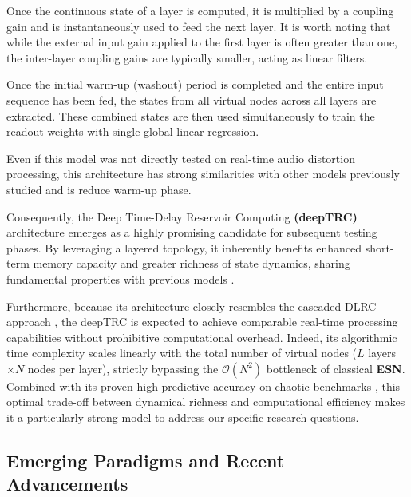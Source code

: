 Once the continuous state of a layer is computed, it is multiplied by a coupling gain and is instantaneously used to feed the next layer. It is worth noting that while the external input gain applied to the first layer is often greater than one, the inter-layer coupling gains are typically smaller, acting as linear filters.

\vspace{0.5cm}

Once the initial warm-up (washout) period is completed and the entire input sequence has been fed, the states from all virtual nodes across all layers are extracted. These combined states are then used simultaneously to train the readout weights with single global linear regression.

\vspace{0.5cm}

Even if this model was not directly tested on real-time audio distortion processing, this architecture has strong similarities with other models previously studied and is reduce warm-up phase\cite{Gulina17Chaos}.

\vspace{0.5cm}

Consequently, the Deep Time-Delay Reservoir Computing \textbf{(deepTRC)} architecture emerges as a highly promising candidate for subsequent testing phases. By leveraging a layered topology, it inherently benefits enhanced short-term memory capacity and greater richness of state dynamics, sharing fundamental properties with previous models \cite{Keuninckx2017RealTime, Gallicchio2017, Appeltant2011Information}. 

\vspace{0.5cm}

Furthermore, because its architecture closely resembles the cascaded DLRC approach \cite{Keuninckx2017RealTime}, the deepTRC is expected to achieve comparable real-time processing capabilities without prohibitive computational overhead. Indeed, its algorithmic time complexity scales linearly with the total number of virtual nodes ($L$ layers $\times N$ nodes per layer), strictly bypassing the $\mathcal{O}(N^2)$ bottleneck of classical \textbf{ESN}. Combined with its proven high predictive accuracy on chaotic benchmarks \cite{goldmann2020deep}, this optimal trade-off between dynamical richness and computational efficiency makes it a particularly strong model to address our specific research questions.

\subsection{Emerging Paradigms and Recent Advancements}

